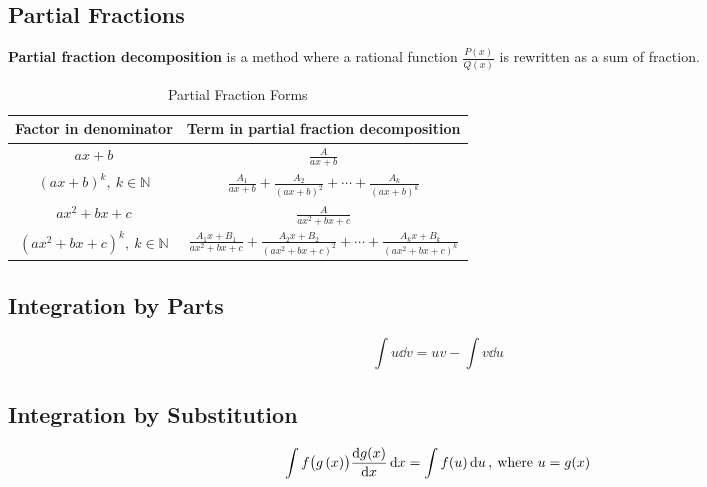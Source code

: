 \documentclass{article}
\begin{document}
\subsection{Partial Fractions}
\begin{definition}
    \textbf{Partial fraction decomposition} is a \linebreak method where a rational function $\displaystyle \frac{P(x)}{Q(x)}$ is rewritten as a sum of fraction.
\end{definition}
\begin{table}[H]
    \renewcommand*{\arraystretch}{1.5}
    \centering
    \begin{tabular}{c | c}
        \toprule
            \textbf{Factor in denominator} & \textbf{Term in partial fraction decomposition} \\
        \midrule
            $ax+b$ & $\displaystyle \frac{A}{ax+b}$ \\[10pt]
            $\left(ax+b\right)^k, \: k \in \mathbb{N}$ & $\displaystyle \frac{A_1}{ax+b} + \frac{A_2}{\left( ax+b \right)^2} + \cdots + \frac{A_k}{\left( ax+b \right)^k}$ \\[10pt]
            $ax^2+bx+c$ & $\displaystyle \frac{A}{ax^2+bx+c}$ \\[10pt]
            $\left(ax^2+bx+c\right)^k, \: k \in \mathbb{N}$ & $\displaystyle \frac{A_1x+B_1}{ax^2+bx+c} + \frac{A_2x+B_2}{\left( ax^2+bx+c \right)^2} + \cdots + \frac{A_kx+B_k}{\left( ax^2+bx+c \right)^k}$ \\[10pt]
        \bottomrule
    \end{tabular}
    \caption{Partial Fraction Forms}
\end{table}
\subsection{Integration by Parts}
\begin{theorem}
\begin{equation*}
    \int u \dd{v} = uv - \int v \dd{u}
\end{equation*}
\end{theorem}
\subsection{Integration by Substitution}
\begin{theorem}
    \begin{equation*}
        \int f\bigl(g\left( x \right)\bigr)\dv{g(x)}{x} \dd{x} = \int f(u) \dd{u}, \: \text{where } u = g(x)
    \end{equation*}
\end{theorem}
\end{document}
